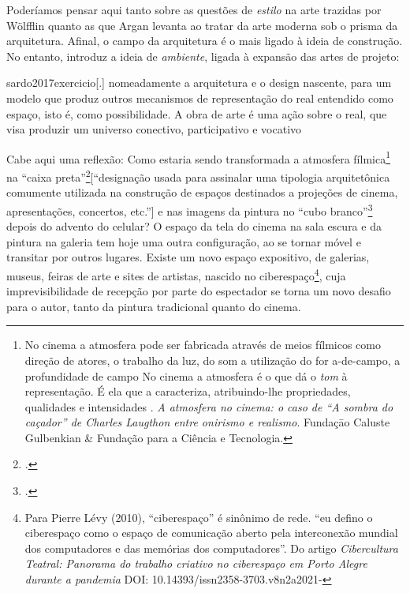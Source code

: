 Poderíamos pensar aqui tanto sobre as questões de \emph{estilo} na arte
trazidas por Wölfflin quanto as que Argan levanta ao tratar da arte
moderna sob o prisma da arquitetura. Afinal, o campo da arquitetura é o
mais ligado à ideia de construção. No entanto,
\textcite{sardo2017exercicio} introduz a ideia de \emph{ambiente},
ligada à expansão das artes de projeto:

\begin{displaycquote}[206]{sardo2017exercicio}[.]
	\textelp{} nomeadamente a arquitetura e o design nascente, para um modelo que
	produz outros mecanismos de representação do real entendido como espaço,
	isto é, como possibilidade. A obra de arte é uma ação sobre o real, que
	visa produzir um universo conectivo, participativo e vocativo
\end{displaycquote}

Cabe aqui uma reflexão: Como estaria sendo transformada a atmosfera
fílmica\footnote{No cinema a atmosfera pode ser fabricada através de
	meios fílmicos como direção de atores, o trabalho da luz, do som
	\textelp{} a utilização do for a-de-campo, a profundidade de campo
	\textelp{} No cinema a atmosfera é o que dá o \emph{tom} à
	representação. É ela que a caracteriza, atribuindo-lhe propriedades,
	qualidades e intensidades \parencite{gil2005atmosfera}. \emph{A atmosfera no cinema: o caso de
		\enquote{A sombra do caçador} de Charles Laugthon entre onirismo e
		realismo}. Fundaçāo Caluste Gulbenkian \& Fundação para a Ciência e
	Tecnologia.} na \enquote{caixa
	preta}\footcite[Segundo][40]{porras2010entre}[\enquote{designação usada
		para assinalar uma tipologia arquitetônica comumente utilizada na
		construção de espaços destinados a projeções de cinema, apresentações,
		concertos, etc.}] e nas imagens da pintura no \enquote{cubo
	branco}\footcite[Designação usada para indicar os espaços de exibição
	próprios das artes plásticas e/ou visuais, tais como museus e galerias.
	(p.~46)]{porras2010entre} depois do advento do celular? O espaço da
tela do cinema na sala escura e da pintura na galeria tem hoje uma
outra configuração, ao se tornar móvel e transitar por outros lugares.
Existe um novo espaço expositivo, de galerias, museus, feiras de arte e
sites de artistas, nascido no ciberespaço\footnote{Para Pierre Lévy
	(2010), \enquote{ciberespaço} é sinônimo de rede. \enquote{eu defino o
		ciberespaço como o espaço de comunicação aberto pela interconexão
		mundial dos computadores e das memórias dos computadores}. Do artigo
	\emph{Cibercultura Teatral: Panorama do trabalho criativo no
		ciberespaço em Porto Alegre durante a pandemia} DOI:
	10.14393/issn2358-3703.v8n2a2021-}, cuja imprevisibilidade de recepção
por parte do espectador se torna um novo desafio para o autor, tanto da
pintura tradicional quanto do cinema.


